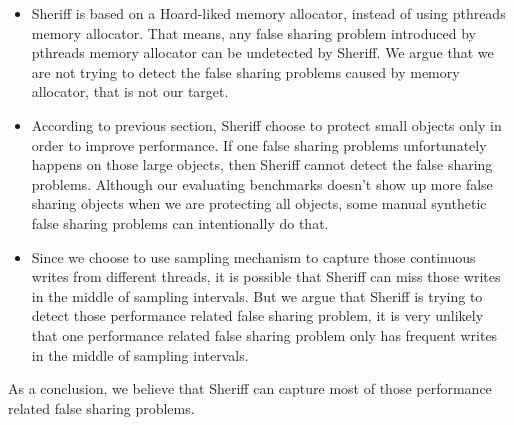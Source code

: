 \begin{itemize}
\item
Sheriff is based on a Hoard-liked memory allocator,
instead of using pthreads memory allocator. That means, any false sharing problem introduced by 
pthreads memory allocator can be undetected by Sheriff. 
We argue that we are not trying to detect the false sharing problems caused by memory allocator, that is not our target.
 
\item
According to previous section,
Sheriff choose to protect small objects only in order to improve performance. 
If one false sharing problems unfortunately happens on those large objects, then Sheriff cannot detect 
the false sharing problems. Although our evaluating benchmarks doesn't show up more false sharing objects 
when we are protecting all objects, some manual synthetic false sharing problems can intentionally do that.  

\item
Since we choose to use sampling mechanism to capture those continuous writes from different threads, it is possible
that Sheriff can miss those writes in the middle of sampling intervals. 
But we argue that Sheriff is trying to detect
those performance related false sharing problem, 
it is very unlikely that one performance related false sharing problem only
has frequent writes in the middle of sampling intervals. 
\end{itemize}

As a conclusion, we believe that Sheriff can capture most of those performance related false sharing problems. 
